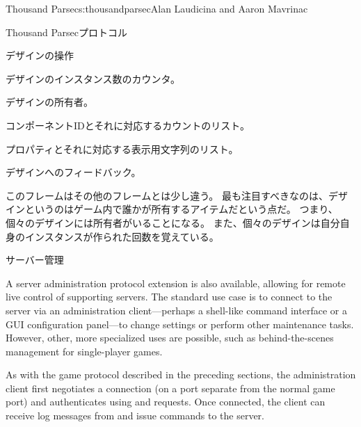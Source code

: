 \begin{aosachapter}{Thousand Parsec}{s:thousandparsec}{Alan Laudicina and Aaron Mavrinac}
\begin{aosasect1}{Thousand Parsecプロトコル}
\begin{aosasect2}{デザインの操作}
\begin{aosaitemize}
  \item デザインのインスタンス数のカウンタ。

  \item デザインの所有者。

  \item コンポーネントIDとそれに対応するカウントのリスト。

  \item プロパティとそれに対応する表示用文字列のリスト。

  \item デザインへのフィードバック。

\end{aosaitemize}

このフレームはその他のフレームとは少し違う。
最も注目すべきなのは、デザインというのはゲーム内で誰かが所有するアイテムだという点だ。
つまり、個々のデザインには所有者がいることになる。
また、個々のデザインは自分自身のインスタンスが作られた回数を覚えている。

\end{aosasect2}

\begin{aosasect2}{サーバー管理}

A server administration protocol extension is also available, allowing
for remote live control of supporting servers. The standard use case
is to connect to the server via an administration client---perhaps a
shell-like command interface or a GUI configuration panel---to change
settings or perform other maintenance tasks. However, other, more
specialized uses are possible, such as behind-the-scenes management
for single-player games.

As with the game protocol described in the preceding sections, the
administration client first negotiates a connection (on a port
separate from the normal game port) and authenticates using
 and  requests. Once connected, the client
can receive log messages from and issue commands to the server.


\end{aosasect2}
\end{aosasect1}
\end{aosachapter}
